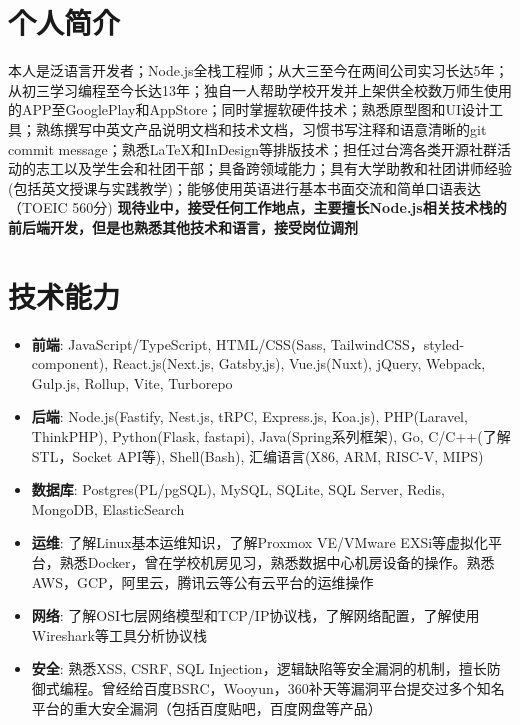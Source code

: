 \documentclass{resume}
\newcommand{\iconsection}[2]{
  \section[\texorpdfstring{#2}{#2}]{\faIcon{#1}\quad #2}
}
\begin{document}
\sloppy



\iconsection{user}{个人简介}
    本人是泛语言开发者；Node.js全栈工程师；从大三至今在两间公司实习长达5年；从初三学习编程至今长达13年；独自一人帮助学校开发并上架供全校数万师生使用的APP至GooglePlay和AppStore；同时掌握软硬件技术；熟悉原型图和UI设计工具；熟练撰写中英文产品说明文档和技术文档，习惯书写注释和语意清晰的git commit message；熟悉\LaTeX 和InDesign等排版技术；担任过台湾各类开源社群活动的志工以及学生会和社团干部；具备跨领域能力；具有大学助教和社团讲师经验(包括英文授课与实践教学)；能够使用英语进行基本书面交流和简单口语表达（TOEIC 560分)
    \newline \textbf{现待业中，接受任何工作地点，主要擅长Node.js相关技术栈的前后端开发，但是也熟悉其他技术和语言，接受岗位调剂}

\iconsection{wrench}{技术能力}
    \begin{itemize}
      \item \textbf{前端}: JavaScript/TypeScript, HTML/CSS(Sass, TailwindCSS，styled-component), React.js(Next.js, Gatsby,js), Vue.js(Nuxt), jQuery, Webpack, Gulp.js, Rollup, Vite, Turborepo
      \item \textbf{后端}: Node.js(Fastify, Nest.js, tRPC, Express.js, Koa.js), PHP(Laravel, ThinkPHP), Python(Flask, fastapi), Java(Spring系列框架), Go, C/C++(了解STL，Socket API等), Shell(Bash), 汇编语言(X86, ARM, RISC-V, MIPS)
      \item \textbf{数据库}: Postgres(PL/pgSQL), MySQL, SQLite, SQL Server, Redis, MongoDB, ElasticSearch
      \item \textbf{运维}: 了解Linux基本运维知识，了解Proxmox VE/VMware EXSi等虚拟化平台，熟悉Docker，曾在学校机房见习，熟悉数据中心机房设备的操作。熟悉AWS，GCP，阿里云，腾讯云等公有云平台的运维操作
      \item \textbf{网络}: 了解OSI七层网络模型和TCP/IP协议栈，了解网络配置，了解使用Wireshark等工具分析协议栈
      \item \textbf{安全}: 熟悉XSS, CSRF, SQL Injection，逻辑缺陷等安全漏洞的机制，擅长防御式编程。曾经给百度BSRC，Wooyun，360补天等漏洞平台提交过多个知名平台的重大安全漏洞（包括百度贴吧，百度网盘等产品）
    \end{itemize}
\end{document}

